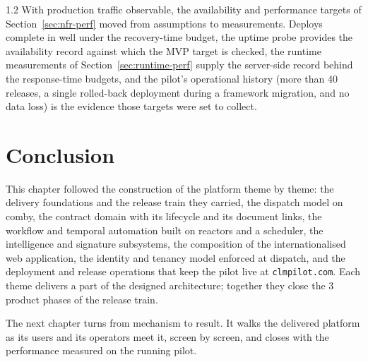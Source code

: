 \begin{spacing}{1.2}
With production traffic observable, the availability and performance
targets of Section~\ref{sec:nfr-perf} moved from assumptions to
measurements. Deploys complete in well under the recovery-time budget,
the uptime probe provides the availability record against which the MVP
target is checked, the runtime measurements of
Section~\ref{sec:runtime-perf} supply the server-side record behind
the response-time budgets, and the pilot's operational history (more than 40
releases, a single rolled-back deployment during a framework migration,
and no data loss) is the evidence those targets were set to collect.

\section*{Conclusion}
This chapter followed the construction of the platform theme by theme:
the delivery foundations and the release train they carried, the
dispatch model on comby, the contract domain with its lifecycle and its
document links, the workflow and temporal automation built on reactors
and a scheduler, the intelligence and signature subsystems, the
composition of the internationalised web application, the identity and
tenancy model enforced at dispatch, and the deployment and release
operations that keep the pilot live at \texttt{clmpilot.com}. Each theme
delivers a part of the designed architecture; together they close the 3
product phases of the release train.

The next chapter turns from mechanism to result. It walks the delivered
platform as its users and its operators meet it, screen by screen, and
closes with the performance measured on the running pilot.

\end{spacing}
